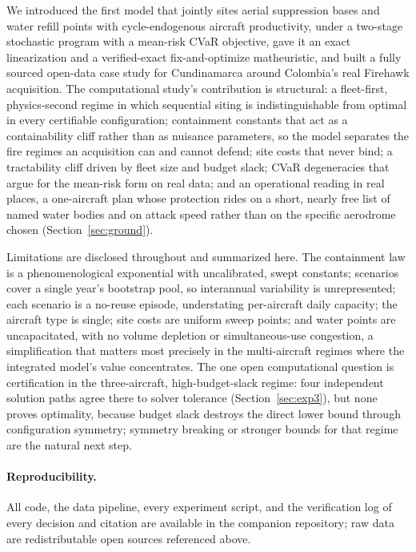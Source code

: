 \documentclass[11pt]{article}
\begin{document}
We introduced the first model that jointly sites aerial suppression
bases and water refill points with cycle-endogenous aircraft
productivity, under a two-stage stochastic program with a mean-risk
CVaR objective, gave it an exact linearization and a verified-exact
fix-and-optimize matheuristic, and built a fully sourced open-data
case study for Cundinamarca around Colombia's real Firehawk
acquisition. The computational study's contribution is structural: a
fleet-first, physics-second regime in which sequential siting is
indistinguishable from optimal in every certifiable configuration;
containment constants that act as a containability cliff rather than
as nuisance parameters, so the model separates the fire regimes an
acquisition can and cannot defend; site costs that never bind; a
tractability cliff driven by fleet size and budget slack; CVaR
degeneracies that argue for the mean-risk form on real data; and an
operational reading in real places, a one-aircraft plan whose
protection rides on a short, nearly free list of named water bodies
and on attack speed rather than on the specific aerodrome chosen
(Section~\ref{sec:ground}).

Limitations are disclosed throughout and summarized here. The
containment law is a phenomenological exponential with uncalibrated,
swept constants; scenarios cover a single year's bootstrap pool, so
interannual variability is unrepresented; each scenario is a
no-reuse episode, understating per-aircraft daily capacity; the
aircraft type is single; site costs are uniform sweep points; and
water points are uncapacitated, with no volume depletion or
simultaneous-use congestion, a simplification that matters most
precisely in the multi-aircraft regimes where the integrated model's
value concentrates. The one open computational question is
certification in the three-aircraft, high-budget-slack regime: four
independent solution paths agree there to solver tolerance
(Section~\ref{sec:exp3}), but none proves optimality, because budget
slack destroys the direct lower bound through configuration
symmetry; symmetry breaking or stronger bounds for that regime are
the natural next step.

\paragraph{Reproducibility.} All code, the data pipeline, every
experiment script, and the verification log of every decision and
citation are available in the companion repository; raw data are
redistributable open sources referenced above.
\end{document}
